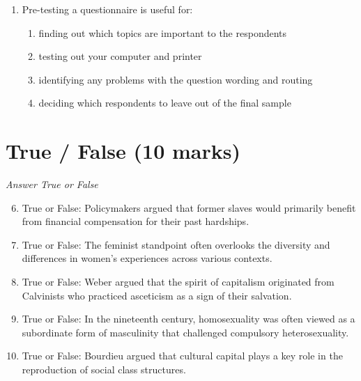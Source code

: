 \documentclass[12pt]{article}
\begin{document}
\begin{enumerate}[label=\arabic*.]
\begin{enumerate}[label=(\alph*)]
    \item it is committed on a larger, often global, scale, and is well organized
    \item it is associated with political conflict between states and their citizens
    \item it can have far-reaching effects upon international relations
    \item all of the above
\end{enumerate}
\item Pre-testing a questionnaire is useful for:
\begin{enumerate}[label=(\alph*)]
    \item finding out which topics are important to the respondents
    \item testing out your computer and printer
    \item identifying any problems with the question wording and routing
    \item deciding which respondents to leave out of the final sample
\end{enumerate}
\end{enumerate}

\section*{True / False (10 marks)}
\textit{Answer True or False}
\begin{enumerate}[label=\arabic*.]
\setcounter{enumi}{5}
\item True or False: Policymakers argued that former slaves would primarily benefit from financial compensation for their past hardships.
\item True or False: The feminist standpoint often overlooks the diversity and differences in women's experiences across various contexts.
\item True or False: Weber argued that the spirit of capitalism originated from Calvinists who practiced asceticism as a sign of their salvation.
\item True or False: In the nineteenth century, homosexuality was often viewed as a subordinate form of masculinity that challenged compulsory heterosexuality.
\item True or False: Bourdieu argued that cultural capital plays a key role in the reproduction of social class structures.
\end{enumerate}
\end{document}
